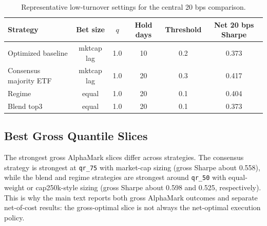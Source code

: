 \begin{table}[h]
\centering
\caption{Representative low-turnover settings for the central 20 bps comparison.}
\label{tab:appendix-centralcase}
\begin{tabular}{lccccc}
\toprule
Strategy & Bet size & $q$ & Hold days & Threshold & Net 20 bps Sharpe \\
\midrule
Optimized baseline & mktcap lag & 1.0 & 10 & 0.2 & 0.373 \\
Consensus majority ETF & mktcap lag & 1.0 & 20 & 0.3 & 0.417 \\
Regime & equal & 1.0 & 20 & 0.1 & 0.404 \\
Blend top3 & equal & 1.0 & 20 & 0.1 & 0.373 \\
\bottomrule
\end{tabular}
\end{table}

\subsection{Best Gross Quantile Slices}

The strongest gross AlphaMark slices differ across strategies. The consensus strategy is strongest at \texttt{qr\_75} with market-cap sizing (gross Sharpe about 0.558), while the blend and regime strategies are strongest around \texttt{qr\_50} with equal-weight or cap250k-style sizing (gross Sharpe about 0.598 and 0.525, respectively). This is why the main text reports both gross AlphaMark outcomes and separate net-of-cost results: the gross-optimal slice is not always the net-optimal execution policy.
